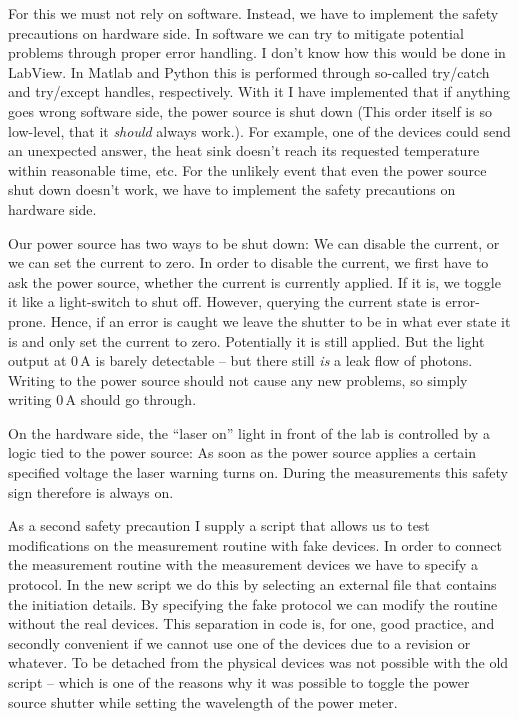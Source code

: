 For this we must not rely on software.
Instead, we have to implement the safety precautions on hardware side.
In software we can try to mitigate
potential problems through proper error handling.
I don't know how this would be done in LabView.
In Matlab and Python this is performed through so-called
try/catch and try/except handles, respectively.
With it I have implemented that if anything goes wrong software side,
the power source is shut down
(This order itself is so low-level,
that it \textit{should} always work.).
For example, one of the devices could send an unexpected answer,
the heat sink doesn't reach its requested temperature within reasonable time, etc.
For the unlikely event
that even the power source shut down doesn't work,
we have to implement the safety precautions on hardware side.

Our power source has two ways to be shut down:
We can disable the current,
or we can set the current to zero.
In order to disable the current,
we first have to ask the power source,
whether the current is currently applied.
If it is, we toggle it like a light-switch to shut off.
However, querying the current state
is error-prone.
Hence, if an error is caught we leave the shutter to be in what ever state it is
and only set the current to zero.
Potentially it is still applied.
But the light output at $0\,\mathrm{A}$
is barely detectable --
but there still \emph{is} a leak flow of photons.
Writing to the power source should not cause any new problems,
so simply writing $0\,\mathrm{A}$ should go through.

On the hardware side,
the ``laser on'' light in front of the lab
is controlled by a logic tied to the power source:
As soon as the power source applies a certain specified voltage
the laser warning turns on.
During the measurements this safety sign therefore
is always on.

As a second safety precaution I supply a script that allows us to test 
modifications on the measurement routine with fake devices.
In order to connect the measurement routine with the measurement devices
we have to specify a protocol.
In the new script we do this by selecting an external file
that contains the initiation details.
By specifying the fake protocol we can modify the routine without the real devices.
This separation in code is, for one, good practice,
and secondly convenient if we cannot use one of the devices due to a revision or whatever.
To be detached from the physical devices was not possible with the old script --
which is one of the reasons why it was possible to toggle the power source shutter
while setting the wavelength of the power meter.

